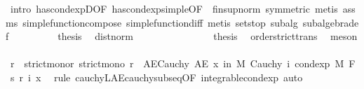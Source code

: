 \begin{isabellebody}
\ {\isacharparenleft}{\kern0pt}intro\ has{\isacharunderscore}{\kern0pt}cond{\isacharunderscore}{\kern0pt}expD{\isacharparenleft}{\kern0pt}{}{\isacharparenright}{\kern0pt}{\isacharbrackleft}{\kern0pt}OF\ has{\isacharunderscore}{\kern0pt}cond{\isacharunderscore}{\kern0pt}exp{\isacharunderscore}{\kern0pt}simple{\isacharbrackleft}{\kern0pt}OF\ {\isacharunderscore}{\kern0pt}\ fin{\isacharunderscore}{\kern0pt}sup{\isacharunderscore}{\kern0pt}norm{\isacharbrackright}{\kern0pt}{\isacharcomma}{\kern0pt}\ symmetric{\isacharbrackright}{\kern0pt}{\isacharparenright}{\kern0pt}\ {\isacharparenleft}{\kern0pt}metis\ assms{\isacharparenleft}{\kern0pt}{}{\isacharparenright}{\kern0pt}\ simple{\isacharunderscore}{\kern0pt}function{\isacharunderscore}{\kern0pt}compose{}\ simple{\isacharunderscore}{\kern0pt}function{\isacharunderscore}{\kern0pt}diff{\isacharcomma}{\kern0pt}\ metis\ sets{\isachardot}{\kern0pt}top\ subalg\ subalgebra{\isacharunderscore}{\kern0pt}def{\isacharparenright}{\kern0pt}\isanewline
\ \ \ \ \ \ \isamarkupfalse%
\ \isamarkupfalse%
\ {\isacharquery}{\kern0pt}thesis\ \isamarkupfalse%
\ dist{\isacharunderscore}{\kern0pt}norm\ \isacommand{{\isachardot}{\kern0pt}}\isamarkupfalse%
\ \ \isanewline
\ \ \ \ \isamarkupfalse%
\isanewline
\ \ \ \ \isamarkupfalse%
\ \isamarkupfalse%
\ {\isacharquery}{\kern0pt}thesis\ \isamarkupfalse%
\ order{\isachardot}{\kern0pt}strict{\isacharunderscore}{\kern0pt}trans{}\ \isamarkupfalse%
\ meson\isanewline
\ \ \isamarkupfalse%
\isanewline
\ \ \isamarkupfalse%
\ \isamarkupfalse%
\ r\ \ strict{\isacharunderscore}{\kern0pt}mono{\isacharunderscore}{\kern0pt}r{\isacharcolon}{\kern0pt}\ {\isachardoublequoteopen}strict{\isacharunderscore}{\kern0pt}mono\ r{\isachardoublequoteclose}\ \ AE{\isacharunderscore}{\kern0pt}Cauchy{\isacharcolon}{\kern0pt}\ {\isachardoublequoteopen}AE\ x\ in\ M{\isachardot}{\kern0pt}\ Cauchy\ {\isacharparenleft}{\kern0pt}{\isasymlambda}i{\isachardot}{\kern0pt}\ cond{\isacharunderscore}{\kern0pt}exp\ M\ F\ {\isacharparenleft}{\kern0pt}s\ {\isacharparenleft}{\kern0pt}r\ i{\isacharparenright}{\kern0pt}{\isacharparenright}{\kern0pt}\ x{\isacharparenright}{\kern0pt}{\isachardoublequoteclose}\ \isamarkupfalse%
\ {\isacharparenleft}{\kern0pt}rule\ cauchy{\isacharunderscore}{\kern0pt}L{}{\isacharunderscore}{\kern0pt}AE{\isacharunderscore}{\kern0pt}cauchy{\isacharunderscore}{\kern0pt}subseq{\isacharbrackleft}{\kern0pt}OF\ integrable{\isacharunderscore}{\kern0pt}cond{\isacharunderscore}{\kern0pt}exp{\isacharbrackright}{\kern0pt}{\isacharcomma}{\kern0pt}\ auto{\isacharparenright}{\kern0pt}\isanewline

\end{isabellebody}
